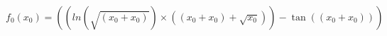 \documentclass{article}
\begin{document}
\begin{equation}
f_0(x_0)=\left(\left(ln( \sqrt{\left(x_0 + x_0\right) }) \times \left(\left(x_0 + x_0\right) +  \sqrt{x_0 }\right)\right) -  \tan(\left(x_0 + x_0\right) )\right)
\end{equation}
\end{document}
